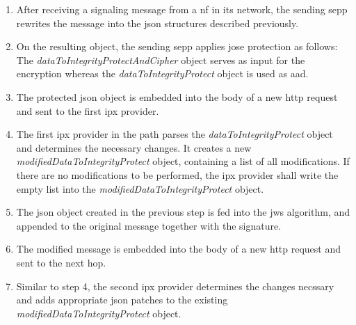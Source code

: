 \begin{enumerate}[wide, labelwidth=!, labelindent=0pt]
    \item After receiving a signaling message from a \gls{nf} in its network, the sending \gls{sepp} rewrites the message into the \gls{json} structures described previously.
    \item On the resulting object, the sending \gls{sepp} applies \gls{jose} protection as follows: The \textit{dataToIntegrityProtectAndCipher} object serves as input for the encryption whereas the \textit{dataToIntegrityProtect} object is used as \gls{aad}.
    \item The protected \gls{json} object is embedded into the body of a new \gls{http} request and sent to the first \gls{ipx} provider.
    \item The first \gls{ipx} provider in the path parses the \textit{dataToIntegrityProtect} object and determines the necessary changes. It creates a new \textit{modifiedDataToIntegrityProtect} object, containing a list of all modifications. If there are no modifications to be performed, the \gls{ipx} provider shall write the empty list into the \textit{modifiedDataToIntegrityProtect} object.
    \item The \gls{json} object created in the previous step is fed into the \gls{jws} algorithm, and appended to the original message together with the signature.
    \item The modified message is embedded into the body of a new \gls{http} request and sent to the next hop.
    \item Similar to step 4, the second \gls{ipx} provider determines the changes necssary and adds appropriate \gls{json} patches to the existing \textit{modifiedDataToIntegrityProtect} object.

\end{enumerate}
